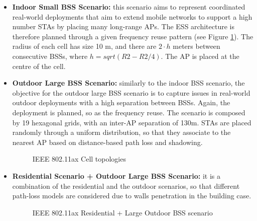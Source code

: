 \documentclass[12pt, a4paper,twoside]{tesi_upf}
\begin{document}
\begin{itemize}
			\item \textbf{Indoor Small BSS  Scenario:} this scenario aims to represent coordinated real-world deployments that aim to extend mobile networks to support a high number STAs by placing many long-range APs. The ESS architecture is therefore planned through a given frequency reuse pattern (see Figure \ref{fig:large_ax}). The radius of each cell has size 10 m, and there are $2 \cdot h$ meters between consecutive BSSs, where $h=sqrt(R2-R2/4)$. The AP is placed at the centre of the cell.			

			\item \textbf{Outdoor Large BSS Scenario:} similarly to the indoor BSS scenario, the objective for the outdoor large BSS scenario is to capture issues in real-world outdoor deployments with a high separation between BSSs. Again, the deployment is planned, so as the frequency reuse. The scenario is composed by 19 hexagonal grids, with an inter-AP separation of 130m. STAs are placed randomly through a uniform distribution, so that they associate to the nearest AP based on distance-based path loss and shadowing.  
			\begin{figure}[h!]
				\centering
				\caption{IEEE 802.11ax Cell topologies}
				\label{fig:large_ax}
			\end{figure}	
		
			\item \textbf{Residential Scenario + Outdoor Large BSS Scenario:} it is a combination of the residential and the outdoor scenarios, so that different path-loss models are considered due to walls penetration in the building case.
			\begin{figure}[h!]
				\centering
				\caption{IEEE 802.11ax Residential + Large Outdoor BSS scenario}
				\label{fig:residential_large_ax}
			\end{figure}	
		\end{itemize}
			
\end{document}
